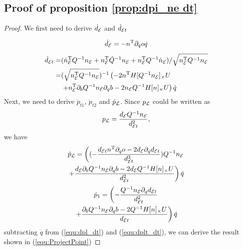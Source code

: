 \documentclass[journal]{IEEEtran}  %
\begin{document}
  \subsection{Proof of proposition \ref{prop:dpi_ne dt}}
  \begin{proof}
    We first need to derive $\dot{d}_{\mathcal{E}}$ and $\dot{d}_{\mathcal{E} t}$

    \begin{equation}
      \dot d_{\mathcal{E}} = -n^\mathrm{T} \partial_q o \dot q
    \end{equation}
    \begin{equation}\label{equ:dot det}
      \begin{split}
        \dot d_{\mathcal{E} t} =&  (\dot n_{\mathcal{E}}^\mathrm{T} Q^{-1} n_{\mathcal{E}} + n_{\mathcal{E}}^\mathrm{T} \dot Q^{-1} n_{\mathcal{E}} + n_{\mathcal{E}}^\mathrm{T} Q^{-1} \dot n_{\mathcal{E}}) /\sqrt{n_{\mathcal{E}}^\mathrm{T} Q^{-1} n_{\mathcal{E}}}\\
        = & (\sqrt{n_{\mathcal{E}}^\mathrm{T} Q^{-1} n_{\mathcal{E}}})^{-1}\left(-2n^\mathrm{T} H[Q^{-1}n_{\mathcal{E}}]_\times U \right.\\
        &\left. + n_{\mathcal{E}} ^\mathrm{T} \partial_b Q^{-1} n_{\mathcal{E}} \partial_q b  -2 n_{\mathcal{E}} Q^{-1}H[n]_\times U \right) \dot q
      \end{split}
    \end{equation}
    Next, we need to derive  $\dot p_{t1}$, $\dot p_{t2} $ and $\dot p_{\mathcal{L}}$. Since $p_{\mathcal{L}}$ could be written as
    \begin{equation}
      p_{\mathcal{L}} = \frac{d_{\mathcal{E}} Q^{-1} n_{\mathcal{E}}}{ d_{\mathcal{E} t} ^2},
    \end{equation}
    we have
    \begin{multline}\label{equ:dpl_dt}
        \dot p_{\mathcal{L}} =  \left( (-\frac{d_{\mathcal{E} t} n^\mathrm{T} \partial_q o -2d_{\mathcal{E}} \partial_q d_{\mathcal{E} t}}{d_{\mathcal{E} t}^3} )Q^{-1}n_{\mathcal{E}} \right.\\
        \left .+ \frac{d_{\mathcal{E}}\partial_b Q^{-1} n_{\mathcal{E}} \partial_q b -  2d_{\mathcal{E}} Q^{-1}H[n]_\times U}{d_{\mathcal{E} t}^2}\right) \dot q
    \end{multline}
    \begin{multline}\label{equ:dplt_dt}
        \dot p_{1} =  \left(-\frac{Q^{-1}n_{\mathcal{E}} \partial_q d_{\mathcal{E} t} }{d_{\mathcal{E} t}^2} \right.\\
         \left. + \frac{\partial_b Q^{-1}n_{\mathcal{E}} \partial_q b -  2Q^{-1}H[n]_\times U }{d_{\mathcal{E} t}} \right) \dot q
    \end{multline}
    subtracting $\dot q$ from (\ref{equ:dpl_dt}) and (\ref{equ:dplt_dt}), we can derive the result shown in (\ref{equ:ProjectPoint})
  \end{proof}


{\small


}
\end{document}

